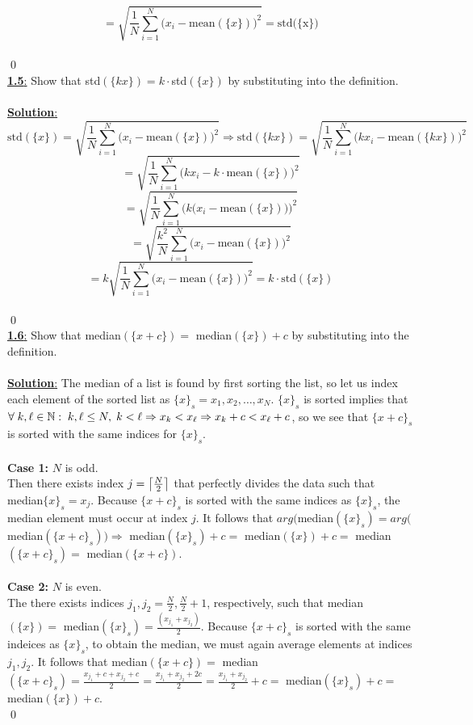 \documentclass[11pt]{article}
\DeclarePairedDelimiter{\ceil}{\lceil}{\rceil}
\begin{document}
\[=\sqrt{\frac{1}{N}\sum_{i=1}^N\Big(x_i-\text{mean}(\{x\})\Big)^2}=\text{std(\{x\})}\] \\ \qed
\newpage
\ \\
\underline{\textbf{1.5}:} Show that std$(\{kx\})=k\cdot$std$(\{x\})$ by substituting into the definition. \\ \\
\underline{\textbf{Solution}:}
\[\text{std}(\{x\})=\sqrt{\frac{1}{N}\sum_{i=1}^N\Big(x_i-\text{mean}(\{x\})\Big)^2}\Rightarrow\text{std}(\{kx\})=\sqrt{\frac{1}{N}\sum_{i=1}^N\Big(kx_i-\text{mean}(\{kx\})\Big)^2}\]
\[=\sqrt{\frac{1}{N}\sum_{i=1}^N\Big(kx_i-k\cdot\text{mean}(\{x\})\Big)^2}\]
\[=\sqrt{\frac{1}{N}\sum_{i=1}^N\Big(k\big(x_i-\text{mean}(\{x\})\big)\Big)^2}\]
\[=\sqrt{\frac{k^2}{N}\sum_{i=1}^N\Big(x_i-\text{mean}(\{x\})\Big)^2}\]
\[=k\sqrt{\frac{1}{N}\sum_{i=1}^N\Big(x_i-\text{mean}(\{x\})\Big)^2}=k\cdot\text{std}(\{x\})\] \\ \qed
\\[20mm]
\underline{\textbf{1.6}:} Show that median$(\{x+c\})=$ median$(\{x\})+c$ by substituting into the definition. \\ \\
\underline{\textbf{Solution}:} The median of a list is found by first sorting the list, so let us index each element of the sorted list as $\{x\}_s=x_1,x_2,\ldots,x_N$. $\{x\}_s$ is sorted implies that $\forall\hspace{1mm}k,\ell\in\mathbb{N}:\hspace{1mm}k,\ell\leq N,\hspace{1mm}k<\ell\Rightarrow x_k<x_\ell\Rightarrow x_k+c<x_\ell+c$, so we see that $\{x+c\}_s$ is sorted with the same indices for $\{x\}_s$. \\ \\
\textbf{Case 1:} $N$ is odd. \\
Then there exists index $j=\ceil*{\frac{N}{2}}$ that perfectly divides the data such that median$\{x\}_s=x_j$. Because $\{x+c\}_s$ is sorted with the same indices as $\{x\}_s$, the median element must occur at index $j$. It follows that  $arg($median$(\{x\}_s)=arg($median$(\{x+c\}_s))\Rightarrow$ median$(\{x\}_s)+c=$ median$(\{x\})+c=$ median $(\{x+c\}_s)=$ median$(\{x+c\})$. \\ \\
\textbf{Case 2:} $N$ is even. \\
The there exists indices $j_1,j_2=\frac{N}{2},\frac{N}{2}+1$, respectively, such that median$(\{x\})=$ median$(\{x\}_s)=\frac{(x_{j_1}+x_{j_2})}{2}$. Because $\{x+c\}_s$ is sorted with the same indeices as $\{x\}_s$, to obtain the median, we must again average elements at indices $j_1,j_2$. It follows that median$(\{x+c\})=$ median$(\{x+c\}_s)=\frac{x_{j_1}+c+x_{j_2}+c}{2}=\frac{x_{j_1}+x_{j_2}+2c}{2}=\frac{x_{j_1}+x_{j_2}}{2}+c=$ median$(\{x\}_s)+c=$ median$(\{x\})+c$. \\ \qed
\end{document}
